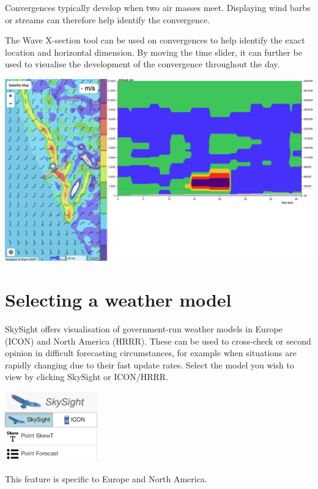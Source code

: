 \documentclass[11pt,a4paper]{article}
\begin{document}
Convergences typically develop when two air masses meet. Displaying wind barbs or streams can therefore help identify the convergence.

The Wave X-section tool can be used on convergences to help identify the exact location and horizontal dimension. By moving the time slider, it can further be used to visualise the development of the convergence throughout the day.

\begin{center}
\includegraphics[width=14cm]{images/convergence_section.png}
\end{center}

\section{Selecting a weather model}
SkySight offers visualisation of government-run weather models in Europe (ICON) and North America (HRRR). These can be used to cross-check or second opinion in difficult forecasting circumstances, for example when situations are rapidly changing due to their fast update rates. Select the model you wish to view by clicking SkySight or ICON/HRRR.

\begin{center}
  \includegraphics[width=4cm]{images/icon_model.png}
  \end{center}

\begin{tip}
  \item This feature is specific to Europe and North America.\\
\end{tip} 
  
\end{document}
